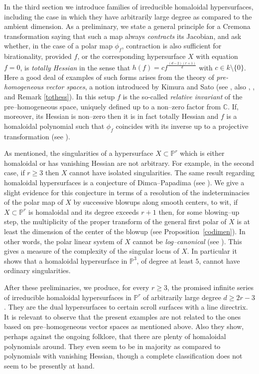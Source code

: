 \documentclass[11pt]{article}   %
\theoremstyle{definition}
\numberwithin{Theorem}{section} \numberwithin{equation}{section}
\newcommand{\C}{{\mathbb C}}
\newcommand{\p}{{\mathbb P}}
\begin{document}
In the third section we { introduce}
 families of irreducible
homaloidal hypersurfaces, including the case {in which they
have} arbitrarily large degree as compared to the ambient
dimension. As a preliminary, we state a general principle for {
a} Cremona transformation saying that such a map always {\it
contracts\/} its Jacobian, and ask whether, in the case of a polar
map $\phi_f$, contraction is also sufficient for birationality,
provided $f$, or the corresponding hypersurface $X$ with equation
$f=0$, is \emph{totally Hessian} in the sense that $h(f)=cf^{\frac
{(d-2)(r+1)}d}$ with $c\in k\setminus \{0\}$. Here a good deal of
examples of such forms arises from the theory of
\emph{pre-homogeneous vector spaces},  a notion introduced by Kimura
and Sato (see \cite{KS}, also \cite{ESB}, \cite{Dolgachev},
\cite{EKP} and Remark \ref {tothess}). In this setup $f$ is the
so-called \emph{relative invariant} of the pre--homogeneous space,
uniquely defined up to a non--zero factor from $\C$. If, moreover,
its Hessian is non--zero then it is in fact totally Hessian and $f$
is a homaloidal polynomial such that $\phi_f$ coincides with its
inverse up to a projective transformation (see \cite[Theorem 2.8]
{ESB}).

As {mentioned}, the
singularities of a hypersurface $X\subset \p^ r$ which is either
homaloidal or has vanishing Hessian are not arbitrary.  For example,
in the second case, if $r\geq 3$ then $X$ cannot have isolated
singularities. The same result regarding homaloidal hypersurfaces
is a conjecture of
Dimca--Papadima (see \cite{DP}). We give a slight evidence for this
conjecture in terms of a resolution of the indeterminacies of the
polar map of $X$ by successive blowups  {
along smooth centers, to wit}, if $X\subset \p^r$ is
homaloidal and its degree exceeds $r+1$ then, for some blowing--up
step, the multiplicity of the proper transform of the general first
polar of $X$ is at least the dimension of the center of the
blowup (see Proposition~\ref{codimen}). In other words, the polar
linear system of $X$ cannot be \emph {log--canonical} (see \cite[pg.
56] {KM}). This gives a measure of the complexity of the singular
locus of $X$. In particular it shows that a homaloidal hypersurface
in $\p^3$, of degree at least $5$, cannot have ordinary
singularities.

After these preliminaries, we produce, for every  $r\geq 3$, the
promised infinite series of irreducible homaloidal hypersurfaces in
$\p^ r$ of arbitrarily large degree $d\geq 2r-3$. They are the dual
hypersurfaces to certain scroll surfaces with a line directrix. It
is relevant to observe that the present examples are not related to
the ones based on pre--homogeneous vector spaces as
mentioned above. Also they show, perhaps
{against} the ongoing folklore, that there are
plenty of homaloidal polynomials around. They even seem to be in
majority as compared to polynomials with vanishing Hessian, though a
complete classification does not seem to be presently at hand.
\end{document}
